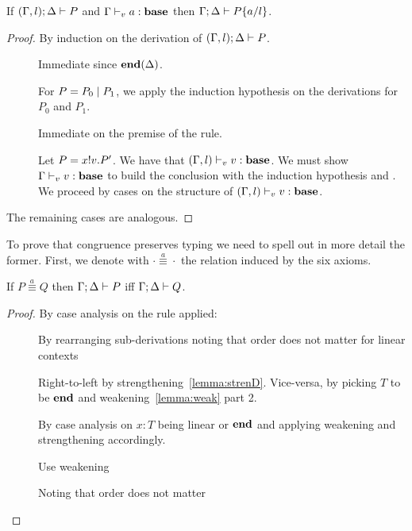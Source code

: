 \begin{lemma}[Substitution]\mbox{}
  \label{le:subst}
  If $(\Gamma, l);\Delta \vdash P$ and
  ${\Gamma \vdash_v a : \mathbf{base}}$ then
  \( \Gamma;\Delta \vdash P\{a/l\} \).
\end{lemma}
\begin{proof}
  By induction on the derivation of $(\Gamma, l);\Delta \vdash P$.
  \begin{description}
  \item[] Immediate since $\mathbf{end}(\Delta)$.

  \item[] For $P = P_0 \mid P_1$, we apply the
    induction hypothesis on the derivations for $P_0$ and $P_1$.

  \item[] Immediate on the premise of the rule.

  \item[] Let $P = x ! v . P'$. We have that
    $(\Gamma, l) \vdash_v v : \mathbf{base}$.  We must show
    $\Gamma \vdash_v v : \mathbf{base}$ to build the conclusion with
    the induction hypothesis and . We proceed by cases
    on the structure of $(\Gamma, l) \vdash_v v : \mathbf{base}$.
  \end{description}
  The remaining cases are analogous.

\end{proof}

\newcommand{\sconga}[2]{#1 \stackrel{a}{\equiv} #2}
To prove that congruence preserves typing we need to spell out in more detail the former. First, we denote with $\sconga\cdot\cdot$ the relation induced by the six axioms.

\begin{lemma}
  \label{le:presequiva}
  If \( \sconga{P}{Q} \) then \( \Gamma;\Delta \vdash P \)  iff \( \Gamma;\Delta \vdash Q \).
\end{lemma}
\begin{proof}
  By case analysis on the  rule applied:
  \begin{description}
  \item[] By rearranging sub-derivations noting that
    order does not matter for linear contexts
  \item[]
   Right-to-left by strengthening~\ref{lemma:strenD}. Vice-versa,
    by picking $T$ to be $\mathbf{end}$ and weakening~\ref{lemma:weak} part 2.
  \item[] By case analysis on $x : T$ being linear or $\mathbf{end}$ and applying weakening and strengthening accordingly.
  \item[] Use weakening %
  \item[] Noting that order does not matter
  \end{description}
\end{proof}

